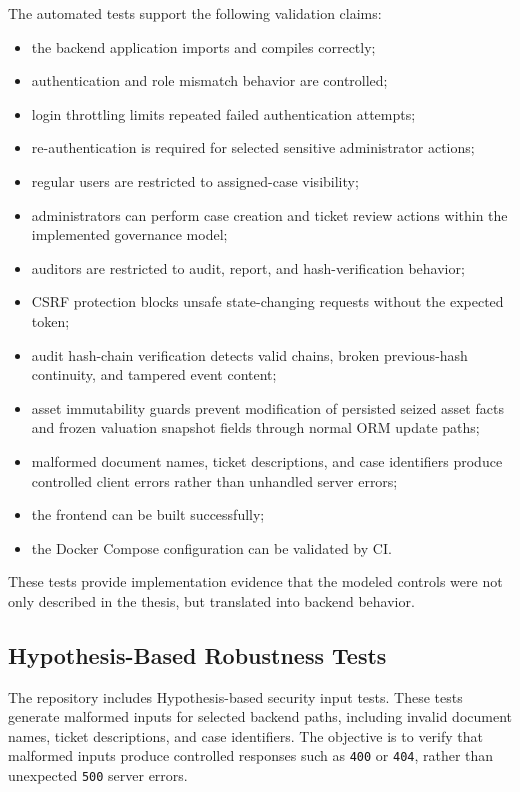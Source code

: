 \documentclass[12pt,a4paper]{report}
\begin{document}
The automated tests support the following validation claims:

\begin{itemize}
    \item the backend application imports and compiles correctly;
    \item authentication and role mismatch behavior are controlled;
    \item login throttling limits repeated failed authentication attempts;
    \item re-authentication is required for selected sensitive administrator actions;
    \item regular users are restricted to assigned-case visibility;
    \item administrators can perform case creation and ticket review actions within the implemented governance model;
    \item auditors are restricted to audit, report, and hash-verification behavior;
    \item CSRF protection blocks unsafe state-changing requests without the expected token;
    \item audit hash-chain verification detects valid chains, broken previous-hash continuity, and tampered event content;
    \item asset immutability guards prevent modification of persisted seized asset facts and frozen valuation snapshot fields through normal ORM update paths;
    \item malformed document names, ticket descriptions, and case identifiers produce controlled client errors rather than unhandled server errors;
    \item the frontend can be built successfully;
    \item the Docker Compose configuration can be validated by CI.
\end{itemize}

These tests provide implementation evidence that the modeled controls were not only described in the thesis, but translated into backend behavior.

\subsection{Hypothesis-Based Robustness Tests}

The repository includes Hypothesis-based security input tests. These tests generate malformed inputs for selected backend paths, including invalid document names, ticket descriptions, and case identifiers. The objective is to verify that malformed inputs produce controlled responses such as \texttt{400} or \texttt{404}, rather than unexpected \texttt{500} server errors.
\end{document}
